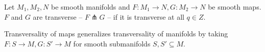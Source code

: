 \begin{definition}\label{def: transverse maps}
    Let $M_{1},M_{2},N$ be smooth manifolds and $F:M_{1}\to N,G:M_{2}\to N$ be smooth maps. $F$ and $G$ are transverse -- $F\pitchfork G$ -- if it is transverse at all $q\in Z$. 
\end{definition}
\begin{remark}
    Transversality of maps generalizes transversality of manifolds by taking $F:S\to M, G:S'\to M$ for smooth submanifolds $S,S'\subseteq M$. 
\end{remark}